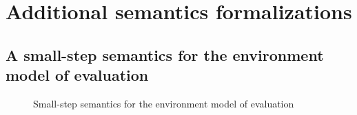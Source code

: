 
\section{Additional semantics formalizations}
\label{app:additional_rules}

\subsection{A small-step semantics for the environment model of evaluation}
\label{sec:small-step-evalenv}

\begin{figure}
  \centering
  \begin{mdframed}
    \begin{singlespace}
      
    \end{singlespace}
  \end{mdframed}
  \caption{Small-step semantics for the environment model of evaluation}
  \label{fig:small-step-rules}
\end{figure}


